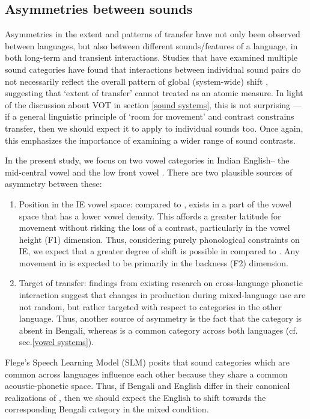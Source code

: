 \documentclass[12 pt]{article}
\newcommand{\nt}[1]{\textipa{[#1]}} %
\begin{document}
\subsection{Asymmetries between sounds}\label{asymmetry between sounds}

Asymmetries in the extent and patterns of transfer have not only been observed between languages, but also between different sounds/features of a language, in both long-term and transient interactions. Studies that have examined multiple sound categories have found that interactions between individual sound pairs do not necessarily reflect the overall pattern of global (system-wide) shift \citep[e.g.][vowel quality]{chang2012rapid,elias2017effects}, suggesting that `extent of transfer' cannot treated as an atomic measure. In light of the discussion about VOT in section \ref{sound systems}, this is not surprising --- if a general linguistic principle of `room for movement' and contrast constrains transfer, then we should expect it to apply to individual sounds too. Once again, this emphasizes the importance of examining a wider range of sound contrasts.


In the present study, we focus on two vowel categories in Indian English-- the mid-central vowel \nt{2} and the low front vowel \nt{\ae}. There are two plausible sources of asymmetry between these:
\begin{enumerate}
	\item Position in the IE vowel space: compared to \nt{\ae}, \nt{2} exists in a part of the vowel space that has a lower vowel density. This affords a greater latitude for movement without risking the loss of a contrast, particularly in the vowel height (F1) dimension. Thus, considering purely phonological constraints on IE, we expect that a greater degree of shift is possible in \nt{2} compared to \nt{\ae}. Any movement in \nt{\ae} is expected to be primarily in the backness (F2) dimension.
	\item Target of transfer: findings from existing research on cross-language phonetic interaction suggest that changes in production during mixed-language use are not random, but rather targeted with respect to categories in the other language. Thus, another source of asymmetry is the fact that the category \nt{2} is absent in Bengali, whereas \nt{\ae} is a common category across both languages (cf. sec.\ref{vowel systems}).
\end{enumerate}


Flege's Speech Learning Model (SLM) \citeyearpar{flege1995second,flege2007language} posits that sound categories which are common across languages influence each other because they share a common acoustic-phonetic space. Thus, if Bengali and English differ in their canonical realizations of \nt{\ae}, then we should expect the English \nt{\ae} to shift towards the corresponding Bengali category in the mixed condition. 
\end{document}
